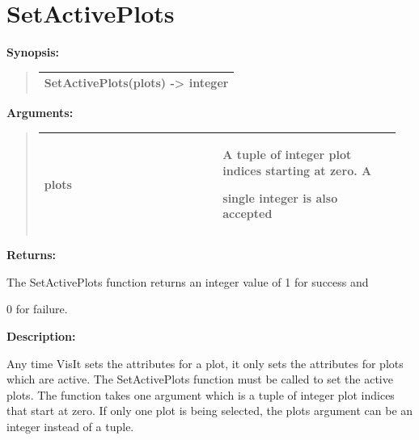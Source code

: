 \documentclass[letterpaper,10pt,english]{sphinxmanual}
\begin{document}
\section{SetActivePlots}
\label{functions:setactiveplots}
\begin{DUlineblock}{0em}
\item[] \textbf{Synopsis:}
\end{DUlineblock}
\begin{quote}

\begin{tabulary}{\linewidth}{|L|}
\hline

SetActivePlots(plots) -\textgreater{} integer
\\
\hline\end{tabulary}

\end{quote}

\begin{DUlineblock}{0em}
\item[] 
\item[] \textbf{Arguments:}
\end{DUlineblock}
\begin{quote}

\begin{tabular}{|p{0.475\linewidth}|p{0.475\linewidth}|}
\hline

plots
 & 
\begin{DUlineblock}{0em}
\item[] A tuple of integer plot indices starting at zero. A
\item[] single integer is also accepted
\end{DUlineblock}
\\
\hline\end{tabular}

\end{quote}

\begin{DUlineblock}{0em}
\item[] 
\item[] \textbf{Returns:}
\item[] The SetActivePlots function returns an integer value of 1 for success and
\item[] 0 for failure.
\item[] 
\item[] \textbf{Description:}
\item[] Any time VisIt sets the attributes for a plot, it only sets the attributes
for plots which are active. The SetActivePlots function must be called to
set the active plots. The function takes one argument which is a tuple of
integer plot indices that start at zero. If only one plot is being
selected, the plots argument can be an integer instead of a tuple.
\end{DUlineblock}
\end{document}
